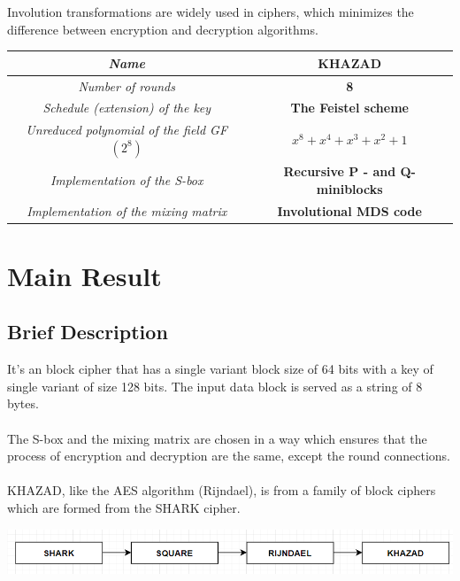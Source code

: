 \documentclass[preprint]{transcrypto}
\begin{document}
Involution transformations are widely used in ciphers, which minimizes the difference between encryption and decryption algorithms.\\ \cite{3}
\begin{center}
        \begin{table}[h]
\begin{tabular}{|c|c|}
\hline
\textit{Name}                                        & \textbf{KHAZAD}                                      \\ \hline
\textit{Number of rounds}                            & \textbf{8}                                           \\ \hline
\textit{Schedule (extension) of the key}             & \textbf{The Feistel scheme}                          \\ \hline
\textit{Unreduced polynomial of the field GF$(2^8)$} & \textbf{$x^8 + x^4 + x^3 + x^2 + 1$}                 \\ \hline
\textit{Implementation of the S-box}                 & \textbf{Recursive P - and Q-miniblocks} \\ \hline
\textit{Implementation of the mixing matrix}         & \textbf{Involutional MDS code}                       \\ \hline
\end{tabular}
\end{table}
\end{center}
\newpage
\section{Main Result}
\label{sec:main}

\subsection{Brief Description}
It's an block cipher that has a single variant block size of 64 bits with a key of single variant of size 128 bits. The input data block is served as a string of 8 bytes.
\\ \\ 
The S-box and the mixing matrix are chosen in a way which ensures that the process of encryption and decryption are the same, except the round connections.
\\ \\
KHAZAD, like the AES algorithm (Rijndael), is from a family of block ciphers which are formed from the SHARK cipher.
\begin{center}
    \includegraphics[scale=0.5]{Screenshots/BLOCK1.png}
\end{center}
\end{document}
